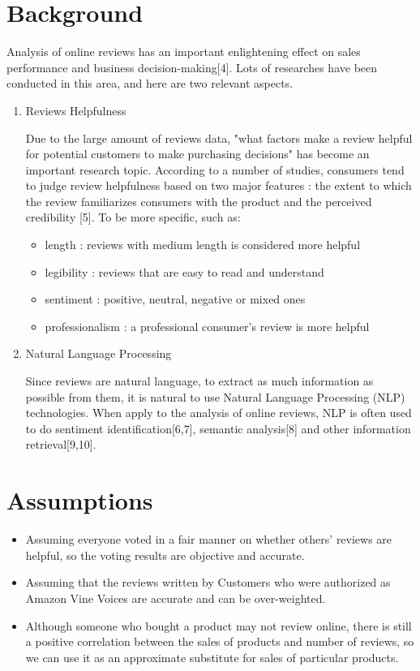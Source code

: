 \documentclass{mcmthesis}
\begin{document}
\section{Background}
\quad \quad Analysis  of  online reviews  has an important enlightening effect on  sales  performance and business decision-making[4]. Lots of researches have been conducted in this area, and here are two relevant aspects.
\begin{enumerate}

\item Reviews Helpfulness

\quad \quad Due to the large amount of reviews data, "what factors make a review helpful for potential customers to make purchasing decisions" has become an important research topic. According to a number of studies, consumers tend to judge review helpfulness based on two major features : the extent to which the review familiarizes consumers with the product and the perceived credibility [5]. To be more specific, such as:
 \begin{itemize}
\item  length  : reviews with medium length is considered more helpful
\item  legibility : reviews that are easy to read and understand
\item  sentiment : positive,  neutral, negative or mixed ones
\item  professionalism : a professional consumer's review is more helpful 
\end{itemize}
\item Natural Language Processing

\quad \quad Since reviews are natural language, to extract as much information as possible from them, it is natural to use Natural Language Processing (NLP) technologies.  When apply to the analysis of online reviews, NLP is often used to  do sentiment identification[6,7], semantic analysis[8] and other information retrieval[9,10].
\end{enumerate}

\section{Assumptions}
\begin{itemize}
\item Assuming everyone voted in a fair manner on whether others' reviews are helpful, so the voting results are objective and accurate.
\item Assuming that the reviews written by Customers who were authorized as Amazon Vine Voices are accurate and can be over-weighted.
\item Although someone who bought a product may not review online, there is still a positive correlation between the sales of products and number of reviews, so we can use it as an approximate substitute for sales of particular products.
\end{itemize}
\end{document}
